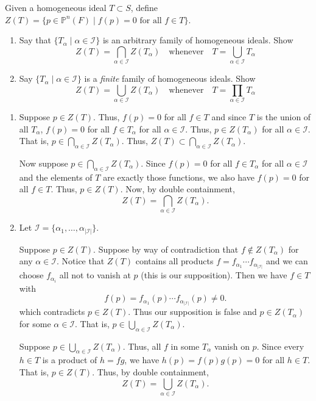 \documentclass[12 pt, letterpaper]{hmcpset}
\begin{document}
\begin{problem}[Problem 3.]
	Given a homogeneous ideal $T \subset S$, define $Z(T) = \{ p \in \mathbb{P}^{n}(F) \mid f(p) = 0 \text{ for all } f \in T \}$.
	\begin{enumerate}
		\item Say that $\{ T_{\alpha} \mid \alpha \in \mathcal{I} \}$ is an arbitrary family of homogeneous ideals. Show
			\[
				Z(T) = \bigcap_{\alpha \in \mathcal{I}} Z(T_{\alpha}) \quad \text{whenever} \quad T = \bigcup_{\alpha \in \mathcal{I}} T_{\alpha}
			\]
		\item Say $\{ T_{\alpha} \mid \alpha \in \mathcal{I} \}$ is a \emph{finite} family of homogeneous ideals. Show
			\[
				Z(T) = \bigcup_{\alpha \in \mathcal{I}} Z(T_{\alpha}) \quad \text{whenever} \quad T = \prod_{\alpha \in \mathcal{I}} T_{\alpha}
			\]
	\end{enumerate}
\end{problem}

\begin{solution}
	\begin{enumerate}
		\item Suppose $p \in Z(T)$. Thus, $f(p) = 0$ for all $f \in T$ and since $T$ is the union of all $T_{\alpha}$, $f(p) = 0$ for all $f \in T_{\alpha}$ for all $\alpha \in \mathcal{I}$. Thus, $p \in Z(T_{\alpha})$ for all $\alpha \in \mathcal{I}$. That is, $p \in \bigcap_{\alpha \in \mathcal{I}} Z(T_{\alpha})$. Thus, $Z(T) \subset \bigcap_{\alpha \in \mathcal{I}} Z(T_{\alpha})$.

			Now suppose $p \in \bigcap_{\alpha \in \mathcal{I}} Z(T_{\alpha})$. Since $f(p) = 0$ for all $f \in T_{\alpha}$ for all $\alpha \in \mathcal{I}$ and the elements of $T$ are exactly those functions, we also have $f(p) = 0$ for all $f \in T$. Thus, $p \in Z(T)$. Now, by double containment,
			\[
				Z(T) = \bigcap_{\alpha \in \mathcal{I}} Z(T_{\alpha}).
			\]
		\item Let $\mathcal{I} = \{ \alpha_{1}, \dots, \alpha_{\lvert \mathcal{I} \rvert} \}$.

			Suppose $p \in Z(T)$. Suppose by way of contradiction that $f \notin Z(T_{\alpha})$ for any $\alpha \in \mathcal{I}$. Notice that $Z(T)$ contains all products $f = f_{\alpha_{1}} \cdots f_{\alpha_{\lvert \mathcal{I} \rvert}}$ and we can choose $f_{\alpha_{i}}$ all not to vanish at $p$ (this is our supposition). Then we have $f \in T$ with
			\[
				f(p) = f_{\alpha_{1}}(p) \cdots f_{\alpha_{\lvert \mathcal{I} \rvert}}(p) \neq 0.
			\]
			which contradicts $p \in Z(T)$. Thus our supposition is false and $p \in Z(T_{\alpha})$ for some $\alpha \in \mathcal{I}$. That is, $p \in \bigcup_{\alpha \in \mathcal{I}} Z(T_{\alpha})$.

			Suppose $p \in \bigcup_{\alpha \in \mathcal{I}} Z(T_{\alpha})$. Thus, all $f$ in some $T_{\alpha}$ vanish on $p$. Since every $h \in T$ is a product of $h = f g$, we have $h(p) = f(p) g(p) = 0$ for all $h \in T$. That is, $p \in Z(T)$. Thus, by double containment,
			\[
				Z(T) = \bigcup_{\alpha \in \mathcal{I}} Z(T_{\alpha}).
			\]
	\end{enumerate}
\end{solution}
\end{document}
